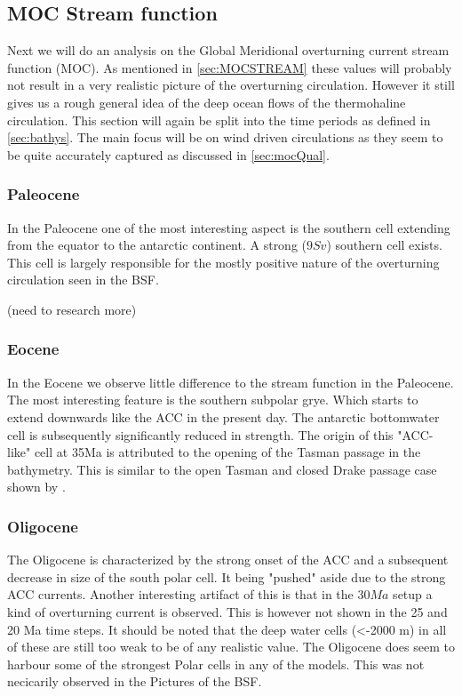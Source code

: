 \subsection{MOC Stream function}

Next we will do an analysis on the Global Meridional overturning current stream function (MOC). As mentioned in \cref{sec:MOCSTREAM} these values will probably not result in a very realistic picture of the overturning circulation. However it still gives us a rough general idea of the deep ocean flows of the thermohaline circulation. This section will again be split into the time periods as defined in \cref{sec:bathys}. The main focus will be on wind driven circulations as they seem to be quite accurately captured as discussed in \cref{sec:mocQual}. 

\subsubsection{Paleocene}
In the Paleocene one of the most interesting aspect is the southern cell extending from the equator to the antarctic continent. A strong ($9 Sv$) southern cell exists. This cell is largely responsible for the mostly positive nature of the overturning circulation seen in the BSF.

(need to research more)


\subsubsection{Eocene}
In the Eocene we observe little difference to the stream function in the Paleocene. The most interesting feature is the southern subpolar grye. Which starts to extend downwards like the ACC in the present day. The antarctic bottomwater cell is subsequently significantly reduced in strength.
The origin of this "ACC-like" cell at 35Ma is attributed to the opening of the Tasman passage in the bathymetry. This is similar to the open Tasman and closed Drake passage case shown by \cite{Sijp2011Dec}.  

\subsubsection{Oligocene}
The Oligocene is characterized by the strong onset of the ACC and a subsequent decrease in size of the south polar cell. It being "pushed" aside due to the strong ACC currents. Another interesting artifact of this is that in the $30 Ma$ setup a kind of overturning current is observed. This is however not shown in the 25 and 20 Ma time steps. It should be noted that the deep water cells (<-2000 m) in all of these are still too weak to be of any realistic value. The Oligocene does seem to harbour some of the strongest Polar cells in any of the models. This was not necicarily observed in the Pictures of the BSF.

